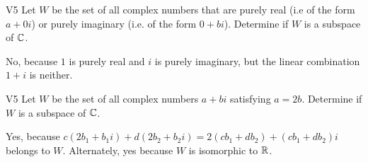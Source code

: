 \begin{problem}{V5} Let \(W\) be the set of all complex numbers
that are purely real (i.e of the form \(a+0i\))  or purely imaginary (i.e. of the form \(0+bi\)).
Determine if \(W\) is a subspace of \(\mathbb{C}\).
\end{problem}
\begin{solution}
No, because \(1\) is purely real and \(i\) is purely imaginary, but
the linear combination \(1+i\) is neither.
\end{solution}


\begin{problem}{V5} Let \(W\) be the set of all complex numbers \(a+bi\)
satisfying  \(a=2b\).
Determine if \(W\) is a subspace of \(\mathbb{C}\).
\end{problem}
\begin{solution}
Yes, because \(c(2b_1+b_1i)+d(2b_2+b_2i)=2(cb_1+db_2)+(cb_1+db_2)i\) belongs to
\(W\). Alternately, yes because \(W\) is isomorphic to \(\mathbb{R}\).
\end{solution}
